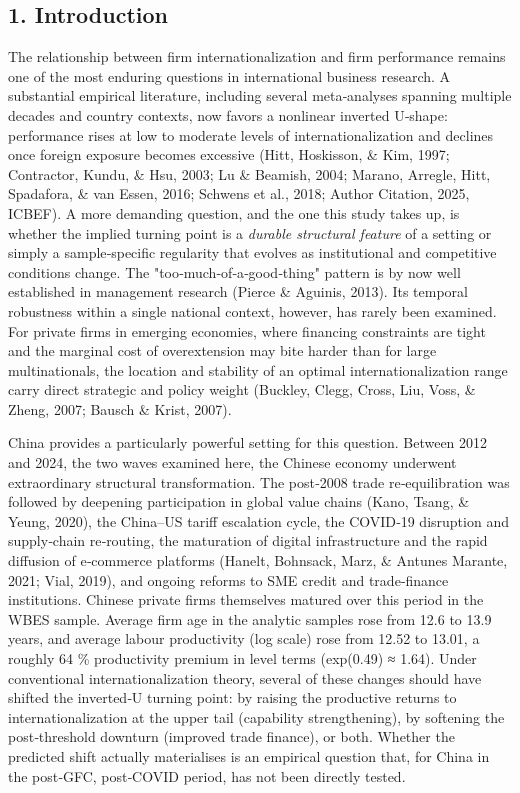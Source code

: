 \documentclass[12pt,a4paper]{article}
\begin{document}
\hypertarget{1-introduction}{%
\subsection{1. Introduction}\label{1-introduction}}

The relationship between firm internationalization and firm performance
remains one of the most enduring questions in international business
research. A substantial empirical literature, including several
meta‑analyses spanning multiple decades and country contexts, now favors
a nonlinear inverted U‑shape: performance rises at low to moderate
levels of internationalization and declines once foreign exposure
becomes excessive (Hitt, Hoskisson, \& Kim, 1997; Contractor, Kundu, \&
Hsu, 2003; Lu \& Beamish, 2004; Marano, Arregle, Hitt, Spadafora, \& van
Essen, 2016; Schwens et al., 2018; Author Citation, 2025, ICBEF). A more
demanding question, and the one this study takes up, is whether the
implied turning point is a \emph{durable structural feature} of a
setting or simply a sample‑specific regularity that evolves as
institutional and competitive conditions change. The
"too‑much‑of‑a‑good‑thing" pattern is by now well established in
management research (Pierce \& Aguinis, 2013). Its temporal robustness
within a single national context, however, has rarely been examined. For
private firms in emerging economies, where financing constraints are
tight and the marginal cost of overextension may bite harder than for
large multinationals, the location and stability of an optimal
internationalization range carry direct strategic and policy weight
(Buckley, Clegg, Cross, Liu, Voss, \& Zheng, 2007; Bausch \& Krist,
2007).

China provides a particularly powerful setting for this question.
Between 2012 and 2024, the two waves examined here, the Chinese economy
underwent extraordinary structural transformation. The post‑2008 trade
re‑equilibration was followed by deepening participation in global value
chains (Kano, Tsang, \& Yeung, 2020), the China--US tariff escalation
cycle, the COVID‑19 disruption and supply‑chain re‑routing, the
maturation of digital infrastructure and the rapid diffusion of
e‑commerce platforms (Hanelt, Bohnsack, Marz, \& Antunes Marante, 2021;
Vial, 2019), and ongoing reforms to SME credit and trade‑finance
institutions. Chinese private firms themselves matured over this period
in the WBES sample. Average firm age in the analytic samples rose from
12.6 to 13.9 years, and average labour productivity (log scale) rose
from 12.52 to 13.01, a roughly 64 \% productivity premium in level terms
(exp(0.49) ≈ 1.64). Under conventional internationalization theory,
several of these changes should have shifted the inverted‑U turning
point: by raising the productive returns to internationalization at the
upper tail (capability strengthening), by softening the post‑threshold
downturn (improved trade finance), or both. Whether the predicted shift
actually materialises is an empirical question that, for China in the
post‑GFC, post‑COVID period, has not been directly tested.
\end{document}
